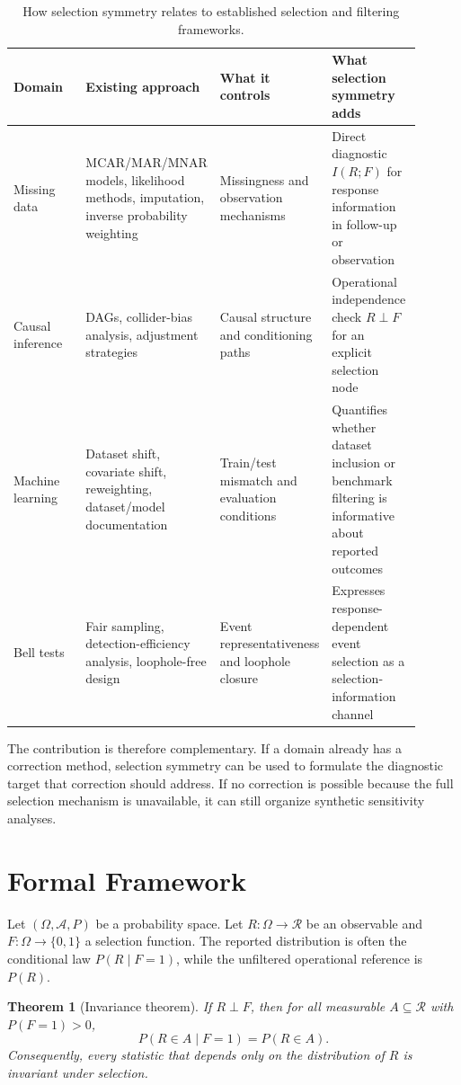 \documentclass[11pt]{article}
\newtheorem{theorem}{Theorem}
\begin{document}
\begin{table}[ht]
\centering
\caption{How selection symmetry relates to established selection and filtering frameworks.}
\label{tab:existing-methods}
\begin{tabular}{p{0.18\linewidth}p{0.25\linewidth}p{0.25\linewidth}p{0.22\linewidth}}
\toprule
Domain & Existing approach & What it controls & What selection symmetry adds \\
\midrule
Missing data & MCAR/MAR/MNAR models, likelihood methods, imputation, inverse probability weighting & Missingness and observation mechanisms & Direct diagnostic \(I(R;F)\) for response information in follow-up or observation \\
Causal inference & DAGs, collider-bias analysis, adjustment strategies & Causal structure and conditioning paths & Operational independence check \(R\perp F\) for an explicit selection node \\
Machine learning & Dataset shift, covariate shift, reweighting, dataset/model documentation & Train/test mismatch and evaluation conditions & Quantifies whether dataset inclusion or benchmark filtering is informative about reported outcomes \\
Bell tests & Fair sampling, detection-efficiency analysis, loophole-free design & Event representativeness and loophole closure & Expresses response-dependent event selection as a selection-information channel \\
\bottomrule
\end{tabular}
\end{table}

The contribution is therefore complementary. If a domain already has a correction method, selection symmetry can be used to formulate the diagnostic target that correction should address. If no correction is possible because the full selection mechanism is unavailable, it can still organize synthetic sensitivity analyses.

\section{Formal Framework}

Let \((\Omega,\mathcal{A},P)\) be a probability space. Let \(R:\Omega \to \mathcal{R}\) be an observable and \(F:\Omega \to \{0,1\}\) a selection function. The reported distribution is often the conditional law \(P(R \mid F=1)\), while the unfiltered operational reference is \(P(R)\).

\begin{theorem}[Invariance theorem]
If \(R \perp F\), then for all measurable \(A \subseteq \mathcal{R}\) with \(P(F=1)>0\),
\begin{equation}
P(R \in A \mid F=1)=P(R \in A).
\end{equation}
Consequently, every statistic that depends only on the distribution of \(R\) is invariant under selection.
\end{theorem}
\end{document}
